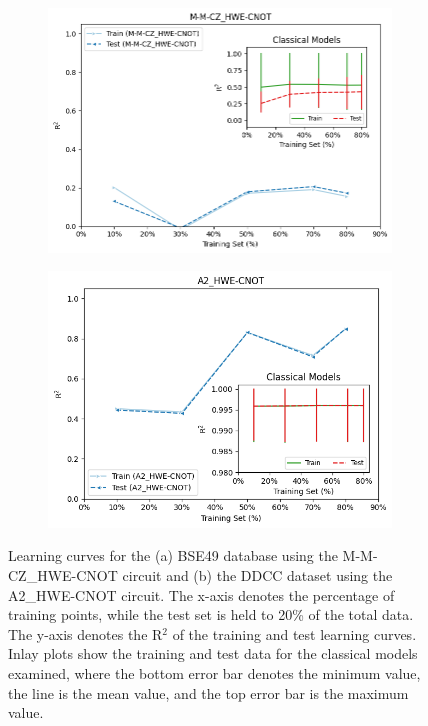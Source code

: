 \documentclass[journal=jacsat,manuscript=article]{achemso}
\begin{document}
\begin{figure}[H]
	\centering	
	\begin{subfigure}[b]{0.49\textwidth}
		\centering
		\includegraphics[width=\linewidth]{../images/BSE/fivequbit/BSE_learningcurve}
		\caption{}
		\label{fig:BSE5_learning_curves}
	\end{subfigure}	
	\hfill
	\begin{subfigure}{0.49\textwidth}
		\centering
		\includegraphics[width=\linewidth]{../images/DDCC/DDCC_learning_curves}
		\caption{}
		\label{fig:ddcclearningcurves}
	\end{subfigure}
	\caption{Learning curves for the (a) BSE49 database using the M-M-CZ{\_}HWE-CNOT circuit and (b) the DDCC dataset using the A2{\_}HWE-CNOT circuit. The x-axis denotes the percentage of training points, while the test set is held to 20\% of the total data. The y-axis denotes the R$^{2}$ of the training and test learning curves. Inlay plots show the training and test data for the classical models examined, where the bottom error bar denotes the minimum value, the line is the mean value, and the top error bar is the maximum value.}
	\label{fig:learningcurves}
	
\end{figure}
\end{document}
